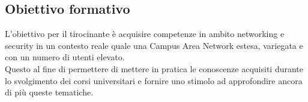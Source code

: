 \documentclass[Tesi.tex]{subfiles}
\begin{document}
\subsection{Obiettivo formativo}
L'obiettivo per il tirocinante è acquisire competenze in ambito networking e security in un contesto reale quale una Campus Area Network estesa, variegata e con un numero di utenti elevato. \\
Questo al fine di permettere di mettere in pratica le conoscenze acquisiti durante lo svolgimento dei corsi universitari e fornire uno stimolo ad approfondire ancora di più queste tematiche.
\end{document}
